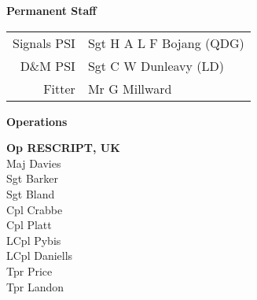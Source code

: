 \pagebreak

\vspace*{10mm}

\begin{center}
  \Large
  \textbf{Permanent Staff}
\end{center}

\begin{center}
  \small
  \begin{tabular}{rl}
    Signals PSI & Sgt H A L F Bojang (QDG) \\
    D\&M PSI & Sgt C W Dunleavy (LD) \\
    Fitter & Mr G Millward \\
  \end{tabular}
\end{center}

\vspace{10mm}

\begin{center}
  \Large
  \textbf{Operations}
\end{center}

\begin{center}
  \noindent
  \textbf{Op RESCRIPT, UK} \\
  Maj Davies \\
  Sgt Barker \\
  Sgt Bland \\
  Cpl Crabbe \\
  Cpl Platt \\
  LCpl Pybis \\
  LCpl Daniells \\
  Tpr Price \\
  Tpr Landon \\
\end{center}